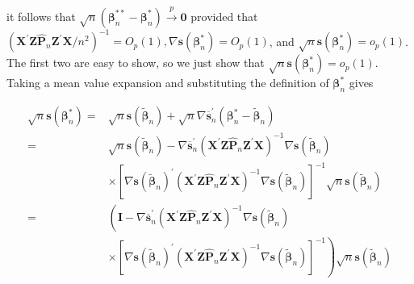 \documentclass[10pt]{article}
\begin{document}
it follows that $\sqrt{n}\left(\boldsymbol{\beta}_{n}^{* *}-\boldsymbol{\beta}_{n}^{*}\right) \xrightarrow{p} \mathbf{0}$ provided that $\left(\mathbf{X}^{\prime} \mathbf{Z} \hat{\mathbf{P}}_{n} \mathbf{Z}^{\prime} \mathbf{X} / n^{2}\right)^{-1}= O_{p}(1), \nabla \mathbf{s}\left(\boldsymbol{\beta}_{n}^{*}\right)=O_{p}(1)$, and $\sqrt{n} \mathbf{s}\left(\boldsymbol{\beta}_{n}^{*}\right)=o_{p}(1)$. The first two are easy to show, so we just show that $\sqrt{n} \mathbf{s}\left(\boldsymbol{\beta}_{n}^{*}\right)=o_{p}(1)$. Taking a mean value expansion and substituting the definition of $\boldsymbol{\beta}_{n}^{*}$ gives

$$
\begin{aligned}
\sqrt{n} \mathbf{s}\left(\boldsymbol{\beta}_{n}^{*}\right)= & \sqrt{n} \mathbf{s}\left(\tilde{\boldsymbol{\beta}}_{n}\right)+\sqrt{n} \nabla \overline{\mathbf{s}}_{n}^{\prime}\left(\boldsymbol{\beta}_{n}^{*}-\tilde{\boldsymbol{\beta}}_{n}\right) \\
= & \sqrt{n} \mathbf{s}\left(\tilde{\boldsymbol{\beta}}_{n}\right)-\nabla \overline{\mathbf{s}}_{n}^{\prime}\left(\mathbf{X}^{\prime} \mathbf{Z} \hat{\mathbf{P}}_{n} \mathbf{Z}^{\prime} \mathbf{X}\right)^{-1} \nabla \mathbf{s}\left(\tilde{\boldsymbol{\beta}}_{n}\right) \\
& \times\left[\nabla \mathbf{s}\left(\tilde{\boldsymbol{\beta}}_{n}\right)^{\prime}\left(\mathbf{X}^{\prime} \mathbf{Z} \hat{\mathbf{P}}_{n} \mathbf{Z}^{\prime} \mathbf{X}\right)^{-1} \nabla \mathbf{s}\left(\tilde{\boldsymbol{\beta}}_{n}\right)\right]^{-1} \sqrt{n} \mathbf{s}\left(\tilde{\boldsymbol{\beta}}_{n}\right) \\
= & \left(\mathbf{I}-\nabla \overline{\mathbf{s}}_{n}^{\prime}\left(\mathbf{X}^{\prime} \mathbf{Z} \hat{\mathbf{P}}_{n} \mathbf{Z}^{\prime} \mathbf{X}\right)^{-1} \nabla \mathbf{s}\left(\tilde{\boldsymbol{\beta}}_{n}\right)\right. \\
& \left.\times\left[\nabla \mathbf{s}\left(\tilde{\boldsymbol{\beta}}_{n}\right)^{\prime}\left(\mathbf{X}^{\prime} \mathbf{Z} \hat{\mathbf{P}}_{n} \mathbf{Z}^{\prime} \mathbf{X}\right)^{-1} \nabla \mathbf{s}\left(\tilde{\boldsymbol{\beta}}_{n}\right)\right]^{-1}\right) \sqrt{n} \mathbf{s}\left(\tilde{\boldsymbol{\beta}}_{n}\right)
\end{aligned}
$$
\end{document}
